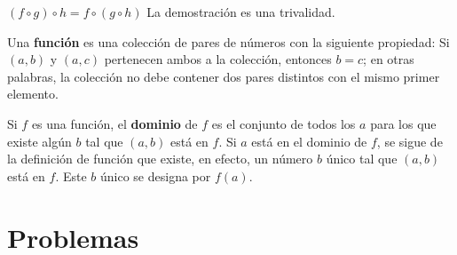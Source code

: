     \begin{prop}
    $(f \circ g) \circ h = f \circ (g \circ h)$   La demostración es una trivalidad.
    \end{prop}

    \begin{def.} 
	Una \textbf{función} es una colección de pares de números con la siguiente propiedad: Si $(a,b)$ \; y \; $(a,c)$ pertenecen ambos a la colección, entonces $b=c$; en otras palabras, la colección no debe contener dos pares distintos con el mismo primer elemento.\\
    \end{def.}

    \begin{def.} 
	Si $f$ es una función, el \textbf{dominio} de $f$ es el conjunto de todos los $a$ para los que existe algún $b$ tal que $(a,b)$ está en $f$. Si $a$ está en el dominio de $f$, se sigue de la definición de función que existe, en efecto, un número $b$ único tal que $(a,b)$ está en $f$. Este $b$ único se designa por $f(a)$.\\  
    \end{def.}


\section{Problemas}

